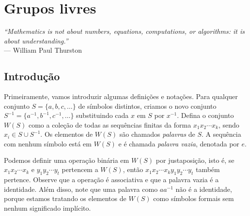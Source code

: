 \chapter[Grupos livres]{Grupos livres}
\label{cap-grupos-livres}
\chaptermark{}
%
\hfill%
\begin{minipage}{10cm}
\begin{flushright}
\rightskip=0.5cm
\textit{``Mathematics is not about numbers, equations, computations, or algorithms: it is about understanding.''}
\\[0.1cm]
\rightskip=0.5cm
--- William Paul Thurston
\end{flushright}
\end{minipage}

\section{Introdução}

    Primeiramente, vamos introduzir algumas definições e notações. Para qualquer conjunto 
    $S = \{ a, b, c, \dots \}$ de símbolos distintos, criamos o novo conjunto 
    $S^{-1} = \{ a^{-1}, b^{-1}, c^{-1}, \dots \}$ substituindo cada $x$ em $S$ por $x^{-1}$. 
    Defina o conjunto $W(S)$ como a coleção de todas as sequências finitas da forma $x_1x_2\cdots x_k$, 
    sendo $x_i\in S\cup S^{-1}$. Os elementos de $W(S)$ são chamados \textit{palavras} de $S$. 
    A sequência com nenhum símbolo está em $W(S)$ e é chamada \textit{palavra vazia}, denotada por $e$.
	
	\par\vspace{0.3cm} Podemos definir uma operação binária em $W(S)$ por justaposição, isto é, 
	se $x_1x_2\cdots x_k$ e $y_1y_2\cdots y_t$ pertencem a $W(S)$, então $x_1x_2\cdots x_ky_1y_2\cdots y_t$ 
	também pertence. Observe que a operação é associativa e que a palavra vazia é a identidade. 
	Além disso, note que uma palavra como $aa^{-1}$ não é a identidade, porque estamos tratando 
	os elementos de $W(S)$ como símbolos formais sem nenhum significado implícito.
	
